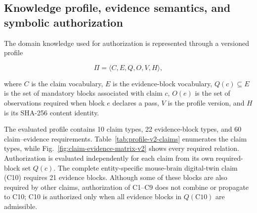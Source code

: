 \documentclass[11pt,a4paper]{article}
\begin{document}




\subsection{Knowledge profile, evidence semantics, and symbolic authorization}
\label{subsec:authorization-semantics}

The domain knowledge used for authorization is represented through a
versioned profile

\begin{equation}
\Pi=\langle C,E,Q,O,V,H\rangle,
\label{eq:profile-v2}
\end{equation}

where $C$ is the claim vocabulary, $E$ is the evidence-block vocabulary,
$Q(c)\subseteq E$ is the set of mandatory blocks associated with claim $c$,
$O(e)$ is the set of observations required when block $e$ declares a pass,
$V$ is the profile version, and $H$ is its SHA-256 content identity.

The evaluated profile contains 10 claim types, 22 evidence-block types, and
60 claim--evidence requirements. Table~\ref{tab:profile-v2-claims}
enumerates the claim types, while
Fig.~\ref{fig:claim-evidence-matrix-v2} shows every required relation.
Authorization is evaluated independently for each claim from its own
required-block set $Q(c)$. The complete entity-specific mouse-brain
digital-twin claim (C10) requires 21 evidence blocks. Although some of these
blocks are also required by other claims, authorization of C1--C9 does not
combine or propagate to C10; C10 is authorized only when all evidence blocks
in $Q(\mathrm{C10})$ are admissible.
\end{document}
